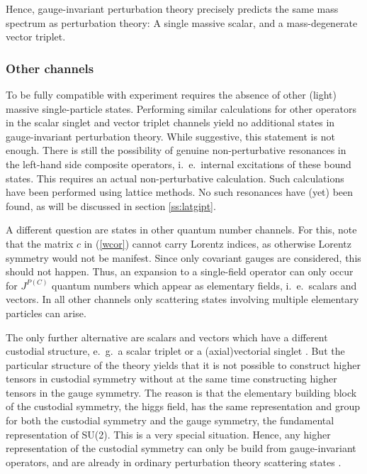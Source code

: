\documentclass[final,twoside,12pt]{article}
\newcommand*{\pref}[1]{(\ref{#1})}
\newcommand*{\1}{1\!\!\!\bot}
\begin{document}
Hence, gauge-invariant perturbation theory precisely predicts the same mass spectrum as perturbation theory: A single massive scalar, and a mass-degenerate vector triplet.

\subsubsection{Other channels}

To be fully compatible with experiment requires the absence of other (light) massive single-particle states. Performing similar calculations for other operators in the scalar singlet and vector triplet channels yield no additional states in gauge-invariant perturbation theory. While suggestive, this statement is not enough. There is still the possibility of genuine non-perturbative resonances in the left-hand side composite operators, i.\ e.\ internal excitations of these bound states. This requires an actual non-perturbative calculation. Such calculations have been performed using lattice methods. No such resonances have (yet) been found, as will be discussed in section \ref{ss:latgipt}.

A different question are states in other quantum number channels. For this, note that the matrix $c$ in \pref{wcor} cannot carry Lorentz indices, as otherwise Lorentz symmetry would not be manifest. Since only covariant gauges are considered, this should not happen. Thus, an expansion to a single-field operator can only occur for $J^{P(C)}$ quantum numbers which appear as elementary fields, i.\ e.\ scalars and vectors. In all other channels only scattering states involving multiple elementary particles can arise.

The only further alternative are scalars and vectors which have a different custodial structure, e.\ g.\ a scalar triplet or a (axial)vectorial singlet \cite{Wurtz:2013ova}. But the particular structure of the theory yields that it is not possible to construct higher tensors in custodial symmetry without at the same time constructing higher tensors in the gauge symmetry. The reason is that the elementary building block of the custodial symmetry, the higgs field, has the same representation and group for both the custodial symmetry and the gauge symmetry, the fundamental representation of SU(2). This is a very special situation. Hence, any higher representation of the custodial symmetry can only be build from gauge-invariant operators, and are already in ordinary perturbation theory scattering states \cite{Wurtz:2013ova}.
\end{document}
